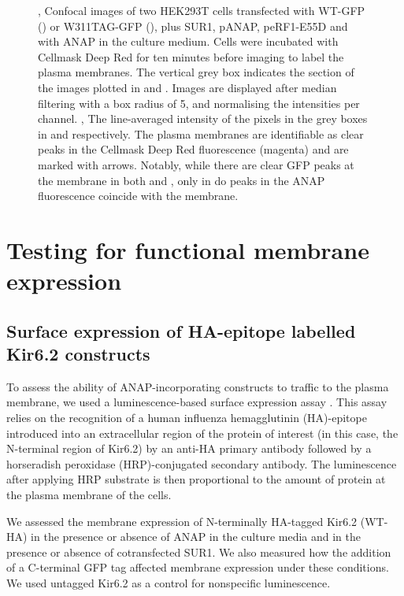 \begin{figure}[hbtp]
\begin{subfigure}[t]{0.35\textwidth}
	\end{subfigure}
	\caption[Confocal imaging]{
	,  Confocal images of two HEK293T cells transfected with WT-GFP () or W311TAG-GFP (), plus SUR1, pANAP, peRF1-E55D and with ANAP in the culture medium.
	Cells were incubated with Cellmask Deep Red for ten minutes before imaging to label the plasma membranes.
	The vertical grey box indicates the section of the images plotted in  and .
	Images are displayed after median filtering with a box radius of 5, and normalising the intensities per channel.
	,  The line-averaged intensity of the pixels in the grey boxes in  and  respectively.
	The plasma membranes are identifiable as clear peaks in the Cellmask Deep Red fluorescence (magenta) and are marked with arrows.
	Notably, while there are clear GFP peaks at the membrane in both  and , only in  do peaks in the ANAP fluorescence coincide with the membrane.
	}
\end{figure}

\section{Testing for functional membrane expression}

\subsection{Surface expression of HA-epitope labelled Kir6.2 constructs}

To assess the ability of ANAP-incorporating constructs to traffic to the plasma membrane, we used a luminescence-based surface expression assay \cite{zerangue_new_1999}.
This assay relies on the recognition of a human influenza hemagglutinin (HA)-epitope introduced into an extracellular region of the protein of interest (in this case, the N-terminal region of Kir6.2) by an anti-HA primary antibody followed by a horseradish peroxidase (HRP)-conjugated secondary antibody.
The luminescence after applying HRP substrate is then proportional to the amount of protein at the plasma membrane of the cells.

We assessed the membrane expression of N-terminally HA-tagged Kir6.2 (WT-HA) in the presence or absence of ANAP in the culture media and in the presence or absence of cotransfected SUR1.
We also measured how the addition of a C-terminal GFP tag affected membrane expression under these conditions.
We used untagged Kir6.2 as a control for nonspecific luminescence.

